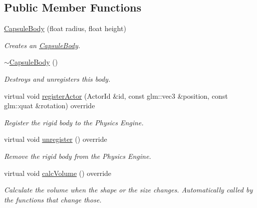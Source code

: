 \subsection*{Public Member Functions}
\begin{DoxyCompactItemize}
\item 
\hyperlink{classTarbora_1_1CapsuleBody_ac7427a8fd201d1eb99944d48619e78ed}{Capsule\+Body} (float radius, float height)
\begin{DoxyCompactList}\small\item\em Creates an \hyperlink{classTarbora_1_1CapsuleBody}{Capsule\+Body}. \end{DoxyCompactList}\item 
\mbox{\label{classTarbora_1_1CapsuleBody_a70eeff3b16e27269076fef05a42a7de8}} 
\hyperlink{classTarbora_1_1CapsuleBody_a70eeff3b16e27269076fef05a42a7de8}{$\sim$\+Capsule\+Body} ()
\begin{DoxyCompactList}\small\item\em Destroys and unregisters this body. \end{DoxyCompactList}\item 
virtual void \hyperlink{classTarbora_1_1CapsuleBody_a4613a4f0cf0ab92189169d6f3865274e}{register\+Actor} (Actor\+Id \&id, const glm\+::vec3 \&position, const glm\+::quat \&rotation) override
\begin{DoxyCompactList}\small\item\em Register the rigid body to the Physics Engine. \end{DoxyCompactList}\item 
\mbox{\label{classTarbora_1_1CapsuleBody_a3cce96469ed469136728ed0ea3004bc0}} 
virtual void \hyperlink{classTarbora_1_1CapsuleBody_a3cce96469ed469136728ed0ea3004bc0}{unregister} () override
\begin{DoxyCompactList}\small\item\em Remove the rigid body from the Physics Engine. \end{DoxyCompactList}\item 
\mbox{\label{classTarbora_1_1CapsuleBody_a16af8c987d2a1d6602a317850b0ae17a}} 
virtual void \hyperlink{classTarbora_1_1CapsuleBody_a16af8c987d2a1d6602a317850b0ae17a}{calc\+Volume} () override
\begin{DoxyCompactList}\small\item\em Calculate the volume when the shape or the size changes. Automatically called by the functions that change those. \end{DoxyCompactList}\item 

\end{DoxyCompactItemize}
